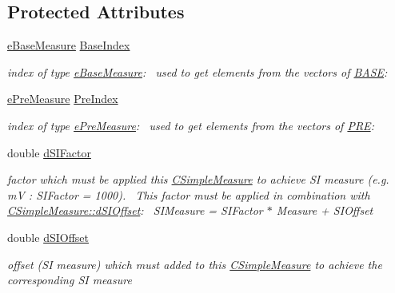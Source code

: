 \subsection*{Protected Attributes}
\begin{DoxyCompactItemize}
\item 
\hyperlink{BaseMeasure_8h_ac90e5164ccf1f0d648fba7e94b229a11}{e\+Base\+Measure} \hyperlink{classCSimpleMeasure_a191dbfa4cc374946bf8a82111f827d92}{Base\+Index}
\begin{DoxyCompactList}\small\item\em index of type \hyperlink{BaseMeasure_8h_ac90e5164ccf1f0d648fba7e94b229a11}{e\+Base\+Measure}\+:~\newline
 used to get elements from the vectors of \hyperlink{BaseMeasure_8h_a79bcfb6bde984f42d1124b068a509af7}{B\+A\+SE}\+: \end{DoxyCompactList}\item 
\hyperlink{PreMeasure_8h_a6c81167b8d4c2badde42f81cb7214620}{e\+Pre\+Measure} \hyperlink{classCSimpleMeasure_aa23ed9eec21adb9a97c90a424e7ee18a}{Pre\+Index}
\begin{DoxyCompactList}\small\item\em index of type \hyperlink{PreMeasure_8h_a6c81167b8d4c2badde42f81cb7214620}{e\+Pre\+Measure}\+:~\newline
 used to get elements from the vectors of \hyperlink{PreMeasure_8h_a349316092037fdd0773335fab4e15ee8}{P\+RE}\+: \end{DoxyCompactList}\item 
double \hyperlink{classCSimpleMeasure_a08be520f9d3a0e50cc63693f2fc607f2}{d\+S\+I\+Factor}
\begin{DoxyCompactList}\small\item\em factor which must be applied this \hyperlink{classCSimpleMeasure}{C\+Simple\+Measure} to achieve SI measure (e.\+g. mV \+: S\+I\+Factor = 1000).~\newline
 This factor must be applied in combination with \hyperlink{classCSimpleMeasure_a27c1637c744a79856ee81869e2aa8890}{C\+Simple\+Measure\+::d\+S\+I\+Offset}\+:~\newline
 S\+I\+Measure = S\+I\+Factor $\ast$ Measure + S\+I\+Offset \end{DoxyCompactList}\item 
double \hyperlink{classCSimpleMeasure_a27c1637c744a79856ee81869e2aa8890}{d\+S\+I\+Offset}
\begin{DoxyCompactList}\small\item\em offset (SI measure) which must added to this \hyperlink{classCSimpleMeasure}{C\+Simple\+Measure} to achieve the corresponding SI measure~\newline

\end{DoxyCompactList}
\end{DoxyCompactItemize}
